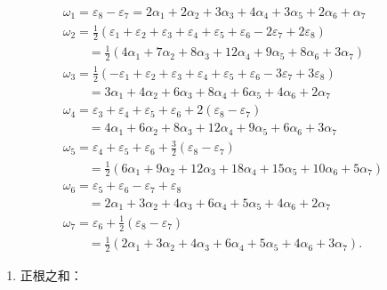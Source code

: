 \[
\begin{array}{l} \omega_ {1} = \varepsilon_ {8} - \varepsilon_ {7} = 2 \alpha_ {1} + 2 \alpha_ {2} + 3 \alpha_ {3} + 4 \alpha_ {4} + 3 \alpha_ {5} + 2 \alpha_ {6} + \alpha_ {7} \\ \omega_ {2} = \frac {1}{2} (\varepsilon_ {1} + \varepsilon_ {2} + \varepsilon_ {3} + \varepsilon_ {4} + \varepsilon_ {5} + \varepsilon_ {6} - 2 \varepsilon_ {7} + 2 \varepsilon_ {8}) \\ \qquad = \frac {1}{2} (4 \alpha_ {1} + 7 \alpha_ {2} + 8 \alpha_ {3} + 12 \alpha_ {4} + 9 \alpha_ {5} + 8 \alpha_ {6} + 3 \alpha_ {7}) \\ \omega_ {3} = \frac {1}{2} (- \varepsilon_ {1} + \varepsilon_ {2} + \varepsilon_ {3} + \varepsilon_ {4} + \varepsilon_ {5} + \varepsilon_ {6} - 3 \varepsilon_ {7} + 3 \varepsilon_ {8}) \\ \qquad = 3 \alpha_ {1} + 4 \alpha_ {2} + 6 \alpha_ {3} + 8 \alpha_ {4} + 6 \alpha_ {5} + 4 \alpha_ {6} + 2 \alpha_ {7} \\ \omega_ {4} = \varepsilon_ {3} + \varepsilon_ {4} + \varepsilon_ {5} + \varepsilon_ {6} + 2 (\varepsilon_ {8} - \varepsilon_ {7}) \\ \qquad = 4 \alpha_ {1} + 6 \alpha_ {2} + 8 \alpha_ {3} + 12 \alpha_ {4} + 9 \alpha_ {5} + 6 \alpha_ {6} + 3 \alpha_ {7} \\ \omega_ {5} = \varepsilon_ {4} + \varepsilon_ {5} + \varepsilon_ {6} + \frac {3}{2} (\varepsilon_ {8} - \varepsilon_ {7}) \\ \qquad = \frac {1}{2} (6 \alpha_ {1} + 9 \alpha_ {2} + 12 \alpha_ {3} + 18 \alpha_ {4} + 15 \alpha_ {5} + 10 \alpha_ {6} + 5 \alpha_ {7}) \\ \omega_ {6} = \varepsilon_ {5} + \varepsilon_ {6} - \varepsilon_ {7} + \varepsilon_ {8} \\ \qquad = 2 \alpha_ {1} + 3 \alpha_ {2} + 4 \alpha_ {3} + 6 \alpha_ {4} + 5 \alpha_ {5} + 4 \alpha_ {6} + 2 \alpha_ {7} \\ \omega_ {7} = \varepsilon_ {6} + \frac {1}{2} (\varepsilon_ {8} - \varepsilon_ {7}) \\ \qquad = \frac {1}{2} (2 \alpha_ {1} + 3 \alpha_ {2} + 4 \alpha_ {3} + 6 \alpha_ {4} + 5 \alpha_ {5} + 4 \alpha_ {6} + 3 \alpha_ {7}). \end{array}
\]

\begin{enumerate}
\def\labelenumi{(\Roman{enumi})}
\setcounter{enumi}{6}
\tightlist
\item
  正根之和：
\end{enumerate}

